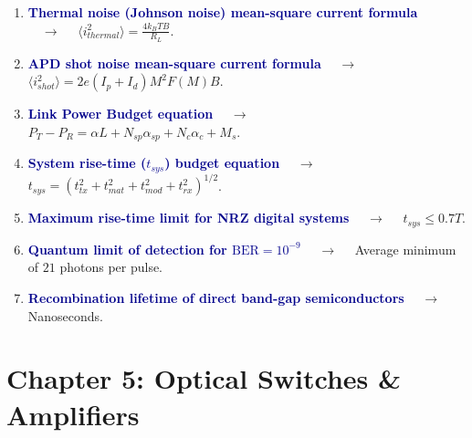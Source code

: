 \documentclass[11pt,a4paper]{article}
\begin{document}
\begin{enumerate}[label=\arabic*., leftmargin=*, labelsep=0.8em, itemsep=0.35em, parsep=0.1em, topsep=0.2em]
  \item \textcolor{darkblue}{\textbf{Thermal noise (Johnson noise) mean-square current formula}} $\quad\to\quad$ $\langle i_{thermal}^2 \rangle = \frac{4 k_B T B}{R_L}$.
  \item \textcolor{darkblue}{\textbf{APD shot noise mean-square current formula}} $\quad\to\quad$ $\langle i_{shot}^2 \rangle = 2e(I_p + I_d)M^2 F(M)B$.
  \item \textcolor{darkblue}{\textbf{Link Power Budget equation}} $\quad\to\quad$ $P_T-P_R=\alpha L+N_{sp}\alpha_{sp}+N_c\alpha_c+M_s$.
  \item \textcolor{darkblue}{\textbf{System rise-time ($t_{sys}$) budget equation}} $\quad\to\quad$ $t_{sys}=(t_{tx}^2+t_{mat}^2+t_{mod}^2+t_{rx}^2)^{1/2}$.
  \item \textcolor{darkblue}{\textbf{Maximum rise-time limit for NRZ digital systems}} $\quad\to\quad$ $t_{sys} \le 0.7 T$.
  \item \textcolor{darkblue}{\textbf{Quantum limit of detection for $\text{BER}=10^{-9}$}} $\quad\to\quad$ Average minimum of $21$ photons per pulse.
  \item \textcolor{darkblue}{\textbf{Recombination lifetime of direct band-gap semiconductors}} $\quad\to\quad$ Nanoseconds.
\end{enumerate}

\section*{Chapter 5: Optical Switches \& Amplifiers}
\end{document}

